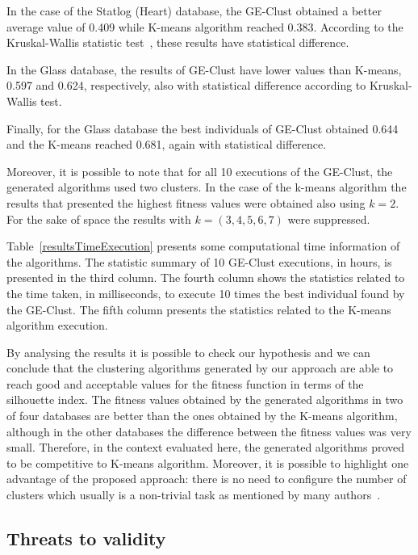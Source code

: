 \documentclass[journal]{IEEEtran}
\begin{document}

	In the case of the Statlog (Heart) database,  the GE-Clust obtained a better average value of 0.409 while K-means algorithm reached 0.383. According to the  Kruskal-Wallis statistic test~\cite{}, these results have statistical difference.
	
	In the Glass database, the results of GE-Clust have lower values than K-means, 0.597 and 0.624, respectively, also with statistical difference according to Kruskal- Wallis test. 
	
	Finally, for the Glass database the best individuals of GE-Clust obtained 0.644 and the K-means reached 0.681, again with statistical difference.
	
	Moreover, it is possible to note that for all 10 executions of the GE-Clust, the generated algorithms used two clusters. In the case of the k-means algorithm the results that presented the highest fitness values were obtained also using $k=2$. For the sake of space the results with $k = (3,4,5,6,7)$ were suppressed.
	
	Table~\ref{resultsTimeExecution} presents some computational time information of the algorithms. The statistic summary of 10 GE-Clust executions, in hours, is presented in the third column. The fourth column shows the statistics related to the time taken, in milliseconds, to execute 10 times the best individual found by the GE-Clust. The fifth column presents the statistics related to the K-means algorithm execution.
	
	By analysing the results it is possible to check our hypothesis and we can conclude that the clustering algorithms generated by our approach are able to reach good and acceptable values for the fitness function in terms of  the silhouette index. The fitness values obtained by the generated algorithms in two of four databases are better than the ones obtained by the K-means algorithm, although in the other databases the difference between the fitness values was very small. Therefore, in the context evaluated here, the generated algorithms proved to be competitive to K-means algorithm. Moreover, it is possible to highlight one advantage of the proposed approach: there is no need to configure the number of clusters which usually is a non-trivial task as mentioned by many authors~\cite{pham2005selection, yan2005methods, tibshirani2001estimating}.
	
	
\subsection{Threats to validity}
\end{document}
